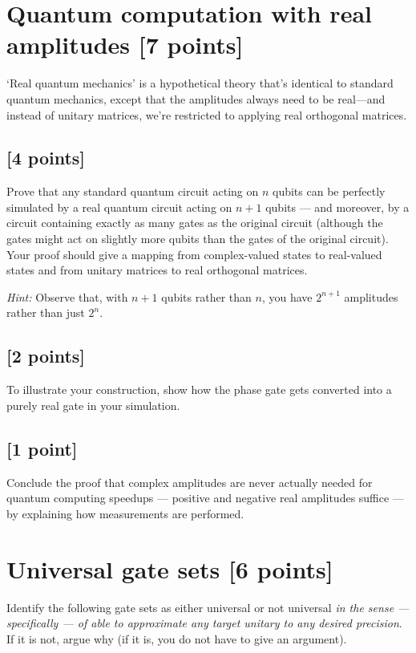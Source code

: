 \documentclass[11pt]{article}
\begin{document}
\section{Quantum computation with real amplitudes [7 points]} `Real quantum mechanics' is a hypothetical theory that's identical to standard quantum mechanics, except that the amplitudes always need to be real---and instead of unitary matrices, we're restricted to applying real orthogonal matrices.

\subsection{[4 points]}
Prove that any standard quantum circuit acting on $n$ qubits can be perfectly simulated by a real quantum circuit acting on $n+1$ qubits --- and moreover, by a circuit containing exactly as many gates as the original circuit (although the gates might act on slightly more qubits than the gates of the original circuit). Your proof should give a mapping from complex-valued states to real-valued states and from unitary matrices to real orthogonal matrices.

\noindent \textit{Hint:} Observe that, with $n+1$ qubits rather than $n$, you have $2^{n+1}$ amplitudes rather than just $2^n$.

\subsection{[2 points]}
To illustrate your construction, show how the phase gate gets converted into a purely real gate in your simulation. 

\subsection{[1 point]}
Conclude the proof that complex amplitudes are never actually needed for quantum computing speedups --- positive and negative real amplitudes suffice --- by explaining how measurements are performed. 








\section{Universal gate sets [6 points]} Identify the following gate sets as either universal or not universal \emph{in the sense --- specifically --- of able to approximate any target unitary to any desired precision}. If it is not, argue why (if it is, you do not have to give an argument).
\end{document}

